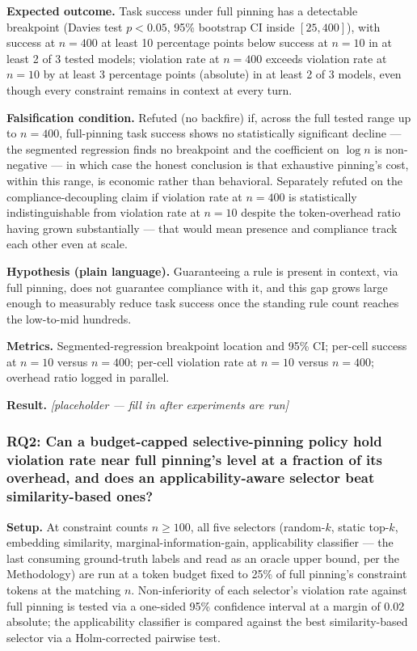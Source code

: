 \documentclass[11pt]{article}
\newcommand{\ph}{\textit{[placeholder --- fill in after experiments are run]}}
\begin{document}
\textbf{Expected outcome.} Task success under full pinning has a detectable breakpoint (Davies test $p < 0.05$, 95\% bootstrap CI inside $[25, 400]$), with success at $n=400$ at least 10 percentage points below success at $n=10$ in at least 2 of 3 tested models; violation rate at $n=400$ exceeds violation rate at $n=10$ by at least 3 percentage points (absolute) in at least 2 of 3 models, even though every constraint remains in context at every turn.

\textbf{Falsification condition.} Refuted (no backfire) if, across the full tested range up to $n=400$, full-pinning task success shows no statistically significant decline --- the segmented regression finds no breakpoint and the coefficient on $\log n$ is non-negative --- in which case the honest conclusion is that exhaustive pinning's cost, within this range, is economic rather than behavioral. Separately refuted on the compliance-decoupling claim if violation rate at $n=400$ is statistically indistinguishable from violation rate at $n=10$ despite the token-overhead ratio having grown substantially --- that would mean presence and compliance track each other even at scale.

\textbf{Hypothesis (plain language).} Guaranteeing a rule is present in context, via full pinning, does not guarantee compliance with it, and this gap grows large enough to measurably reduce task success once the standing rule count reaches the low-to-mid hundreds.

\textbf{Metrics.} Segmented-regression breakpoint location and 95\% CI; per-cell success at $n=10$ versus $n=400$; per-cell violation rate at $n=10$ versus $n=400$; overhead ratio logged in parallel.

\textbf{Result.} \ph

\subsubsection{RQ2: Can a budget-capped selective-pinning policy hold violation rate near full pinning's level at a fraction of its overhead, and does an applicability-aware selector beat similarity-based ones?}
\textbf{Setup.} At constraint counts $n \geq 100$, all five selectors (random-$k$, static top-$k$, embedding similarity, marginal-information-gain, applicability classifier --- the last consuming ground-truth labels and read as an oracle upper bound, per the Methodology) are run at a token budget fixed to 25\% of full pinning's constraint tokens at the matching $n$. Non-inferiority of each selector's violation rate against full pinning is tested via a one-sided 95\% confidence interval at a margin of 0.02 absolute; the applicability classifier is compared against the best similarity-based selector via a Holm-corrected pairwise test.
\end{document}
